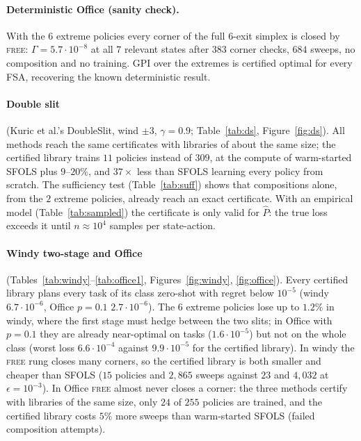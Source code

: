 \documentclass[11pt]{article}
\theoremstyle{definition}
\begin{document}
\paragraph{Deterministic Office (sanity check).} With the $6$ extreme policies every corner of the full $6$-exit
simplex is closed by \textsc{free}: $\Gamma=5.7\cdot10^{-8}$ at all $7$ relevant states after $383$ corner checks, $684$
sweeps, no composition and no training. GPI over the extremes is certified optimal for every FSA, recovering the
known deterministic result.

\paragraph{Double slit} (Kuric et al.'s DoubleSlit, wind $\pm3$, $\gamma=0.9$; Table~\ref{tab:ds}, Figure~\ref{fig:ds}).
All methods reach the same certificates with libraries of about the same size; the certified library trains $11$
policies instead of $309$, at the compute of warm-started SFOLS plus $9$--$20\%$, and $37\times$ less than SFOLS learning
every policy from scratch. The sufficiency test (Table~\ref{tab:suff}) shows that compositions alone, from the $2$ extreme
policies, already reach an exact certificate. With an empirical model (Table~\ref{tab:sampled}) the certificate is
only valid for $\hat P$: the true loss exceeds it until $n\approx10^4$ samples per state-action.

\paragraph{Windy two-stage and Office} (Tables~\ref{tab:windy}--\ref{tab:office1}, Figures~\ref{fig:windy},
\ref{fig:office}). Every certified library plans every task of its class zero-shot with regret below $10^{-5}$ (windy
$6.7\cdot10^{-6}$, Office $p=0.1$ $2.7\cdot10^{-6}$). The $6$ extreme policies lose up to $1.2\%$ in windy, where the
first stage must hedge between the two slits; in Office with $p=0.1$ they are already near-optimal on tasks
($1.6\cdot10^{-5}$) but not on the whole class (worst loss $6.6\cdot10^{-4}$ against $9.9\cdot10^{-5}$ for the certified
library). In windy the \textsc{free} rung closes many corners, so the certified library is both smaller and cheaper than
SFOLS ($15$ policies and $2{,}865$ sweeps against $23$ and $4{,}032$ at $\epsilon=10^{-3}$). In Office \textsc{free}
almost never closes a corner: the three methods certify with libraries of the same size, only $24$ of $255$ policies are
trained, and the certified library costs $5\%$ more sweeps than warm-started SFOLS (failed composition attempts).
\end{document}

